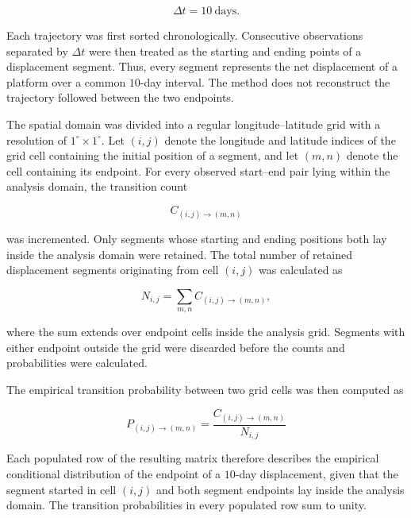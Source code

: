 \documentclass[
  draft
]{agujournal2025}
\begin{document}
            \begin{equation}
                \Delta t = 10~\mathrm{days}.
            \end{equation}

            Each trajectory was first sorted chronologically. Consecutive observations separated by $\Delta t$ were then treated as the starting and ending points of a displacement segment. Thus, every segment represents the net displacement of a platform over a common $10$-day interval. The method does not reconstruct the trajectory followed between the two endpoints. 

            The spatial domain was divided into a regular longitude--latitude grid with a resolution of $1^{\circ}\times1^{\circ}$. Let $(i,j)$ denote the longitude and latitude indices of the grid cell containing the initial position of a segment, and let $(m,n)$ denote the cell containing its endpoint. For every observed start--end pair lying within the analysis domain, the transition count
            
            \begin{equation}
                C_{(i,j)\rightarrow(m,n)}
            \end{equation}

            was incremented. Only segments whose starting and ending positions both lay inside the analysis domain were retained. The total number of retained displacement segments originating from cell $(i,j)$ was calculated as
            
            \begin{equation}
                N_{i,j} = \sum_{m,n} C_{(i,j)\rightarrow(m,n)},
            \end{equation}

            where the sum extends over endpoint cells inside the analysis grid. Segments with either endpoint outside the grid were discarded before the counts and probabilities were calculated.
            
            The empirical transition probability between two grid cells was then computed as
            
            \begin{equation}
                P_{(i,j)\rightarrow(m,n)} = \frac{ C_{(i,j)\rightarrow(m,n)}}{N_{i,j}}
                \label{eq:gridded_transition_probability}
            \end{equation}

            Each populated row of the resulting matrix therefore describes the empirical conditional distribution of the endpoint of a $10$-day displacement, given that the segment started in cell $(i,j)$ and both segment endpoints lay inside the analysis domain. The transition probabilities in every populated row sum to unity.
\end{document}
